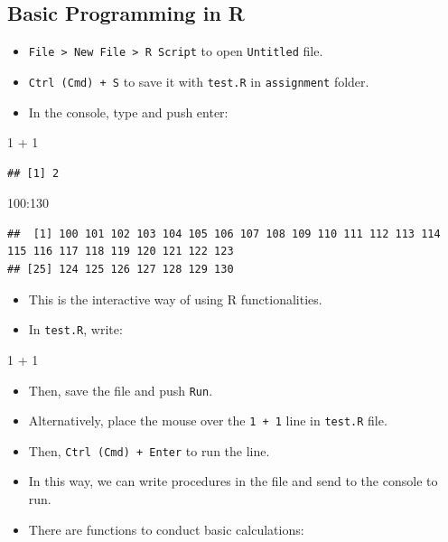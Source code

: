 \documentclass[
]{book}
\newenvironment{Shaded}{\begin{snugshade}}{\end{snugshade}}
\newcommand{\DecValTok}[1]{\textcolor[rgb]{0.00,0.00,0.81}{#1}}
\newcommand{\SpecialCharTok}[1]{\textcolor[rgb]{0.00,0.00,0.00}{#1}}
\providecommand{\tightlist}{%
  \setlength{\itemsep}{0pt}\setlength{\parskip}{0pt}}
\begin{document}
\hypertarget{basic-programming-in-r}{%
\subsection{Basic Programming in R}\label{basic-programming-in-r}}

\begin{itemize}
\tightlist
\item
  \texttt{File\ \textgreater{}\ New\ File\ \textgreater{}\ R\ Script} to open \texttt{Untitled} file.
\item
  \texttt{Ctrl\ (Cmd)\ +\ S} to save it with \texttt{test.R} in \texttt{assignment} folder.
\item
  In the console, type and push enter:
\end{itemize}

\begin{Shaded}
\begin{Highlighting}[]
\DecValTok{1} \SpecialCharTok{+} \DecValTok{1}
\end{Highlighting}
\end{Shaded}

\begin{verbatim}
## [1] 2
\end{verbatim}

\begin{Shaded}
\begin{Highlighting}[]
\DecValTok{100}\SpecialCharTok{:}\DecValTok{130}
\end{Highlighting}
\end{Shaded}

\begin{verbatim}
##  [1] 100 101 102 103 104 105 106 107 108 109 110 111 112 113 114 115 116 117 118 119 120 121 122 123
## [25] 124 125 126 127 128 129 130
\end{verbatim}

\begin{itemize}
\tightlist
\item
  This is the interactive way of using R functionalities.
\item
  In \texttt{test.R}, write:
\end{itemize}

\begin{Shaded}
\begin{Highlighting}[]
\DecValTok{1} \SpecialCharTok{+} \DecValTok{1}
\end{Highlighting}
\end{Shaded}

\begin{itemize}
\item
  Then, save the file and push \texttt{Run}.
\item
  Alternatively, place the mouse over the \texttt{1\ +\ 1} line in \texttt{test.R} file.
\item
  Then, \texttt{Ctrl\ (Cmd)\ +\ Enter} to run the line.
\item
  In this way, we can write procedures in the file and send to the console to run.
\item
  There are functions to conduct basic calculations:
\end{itemize}
\end{document}
